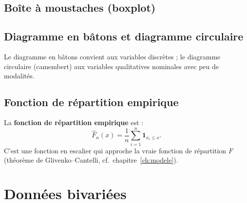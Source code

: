\subsection{Bo\^ite \`a moustaches (boxplot)}

\begin{center}
\end{center}

\subsection{Diagramme en b\^atons et diagramme circulaire}

Le diagramme en b\^atons convient aux variables discr\`etes ; le diagramme circulaire (camembert) aux variables qualitatives nominales avec peu de modalit\'es.

\subsection{Fonction de r\'epartition empirique}

\begin{definition}
La \textbf{fonction de r\'epartition empirique} est :
\[
\hat{F}_n(x) = \frac{1}{n}\sum_{i=1}^n \mathbf{1}_{x_i \leq x}.
\]
C'est une fonction en escalier qui approche la vraie fonction de r\'epartition $F$ (th\'eor\`eme de Glivenko--Cantelli, cf.\ chapitre~\ref{ch:modele}).
\end{definition}

\section{Donn\'ees bivari\'ees}

